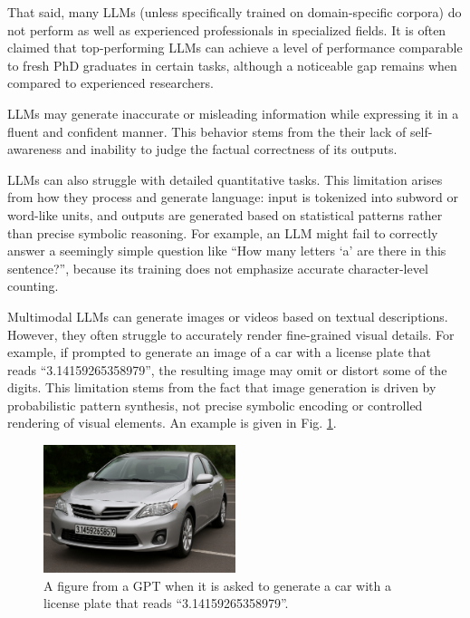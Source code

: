 That said, many LLMs (unless specifically trained on domain-specific corpora) do not perform as well as experienced professionals in specialized fields. It is often claimed that top-performing LLMs can achieve a level of performance comparable to fresh PhD graduates in certain tasks, although a noticeable gap remains when compared to experienced researchers.

LLMs may generate inaccurate or misleading information while expressing it in a fluent and confident manner. This behavior stems from the their lack of self-awareness and inability to judge the factual correctness of its outputs.

LLMs can also struggle with detailed quantitative tasks. This limitation arises from how they process and generate language: input is tokenized into subword or word-like units, and outputs are generated based on statistical patterns rather than precise symbolic reasoning. For example, an LLM might fail to correctly answer a seemingly simple question like ``How many letters `a' are there in this sentence?'', because its training does not emphasize accurate character-level counting.

Multimodal LLMs can generate images or videos based on textual descriptions. However, they often struggle to accurately render fine-grained visual details. For example, if prompted to generate an image of a car with a license plate that reads ``3.14159265358979'', the resulting image may omit or distort some of the digits. This limitation stems from the fact that image generation is driven by probabilistic pattern synthesis, not precise symbolic encoding or controlled rendering of visual elements. An example is given in Fig. \ref{fig:gpt_carplate}.

\begin{figure}[!htb]
	\centering
	\includegraphics[width=0.5\textwidth]{./chapters/part-4/figures/gpt_carplate.png}
	\caption{A figure from a GPT when it is asked to generate a car with a license plate that reads ``3.14159265358979''.}
	\label{fig:gpt_carplate}
\end{figure}

